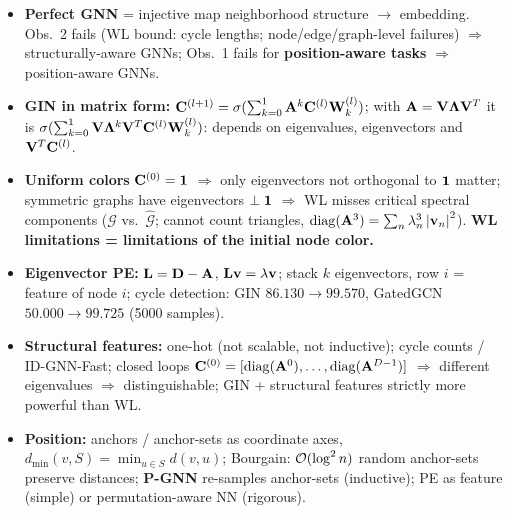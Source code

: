 \bigskip{}
{}
\begin{summarybox}
  \begin{itemize}
    \item \textbf{Perfect GNN} = injective map neighborhood structure $\to$
      embedding. Obs.\ 2 fails (WL bound: cycle lengths; node/edge/graph-level
      failures) $\Rightarrow$ structurally-aware GNNs; Obs.\ 1 fails for
      \textbf{position-aware tasks} $\Rightarrow$ position-aware GNNs.
    \item \textbf{GIN in matrix form:}
      $\mathbf{C}^{(l+1)}=\sigma(\sum_{k=0}^{1}\mathbf{A}^k\mathbf{C}^{(l)}\mathbf{W}_k^{(l)})$; with
      $\mathbf{A}=\mathbf{V}\bm{\Lambda}\mathbf{V}^T$ it is
      $\sigma(\sum_{k=0}^{1}\mathbf{V}\bm{\Lambda}^k\mathbf{V}^T\mathbf{C}^{(l)}\mathbf{W}_k^{(l)})$: depends on
      eigenvalues, eigenvectors and $\mathbf{V}^T\mathbf{C}^{(l)}$.
    \item \textbf{Uniform colors} $\mathbf{C}^{(0)}=\mathbf{1}$ $\Rightarrow$ only
      eigenvectors not orthogonal to $\mathbf{1}$ matter; symmetric graphs have
      eigenvectors $\perp\mathbf{1}$ $\Rightarrow$ WL misses critical spectral
      components ($\mathcal{G}$ vs.\ $\hat{\mathcal{G}}$; cannot count triangles,
      $\operatorname{diag}(\mathbf{A}^3)=\sum_n\lambda_n^3\left\lvert \mathbf{v}_n \right\rvert^2$). \textbf{WL limitations =
      limitations of the initial node color.}
    \item \textbf{Eigenvector PE:} $\mathbf{L}=\mathbf{D}-\mathbf{A}$, $\mathbf{L}\mathbf{v}=\lambda\mathbf{v}$; stack $k$
      eigenvectors, row $i$ = feature of node $i$; cycle detection: GIN
      $86.130\to99.570$, GatedGCN $50.000\to99.725$ (5000 samples).
    \item \textbf{Structural features:} one-hot (not scalable, not inductive);
      cycle counts / ID-GNN-Fast; closed loops
      $\mathbf{C}^{(0)}=[\operatorname{diag}(\mathbf{A}^0),\dots,\operatorname{diag}(\mathbf{A}^{D-1})]$ $\Rightarrow$ different
      eigenvalues $\Rightarrow$ distinguishable; GIN + structural features
      strictly more powerful than WL.
    \item \textbf{Position:} anchors / anchor-sets as coordinate axes,
      $d_{\min}(v,S)=\min_{u\in S}d(v,u)$; Bourgain: $\mathcal{O}(\log^2 n)$ random
      anchor-sets preserve distances; \textbf{P-GNN} re-samples anchor-sets
      (inductive); PE as feature (simple) or permutation-aware NN (rigorous).
  \end{itemize}
\end{summarybox}
